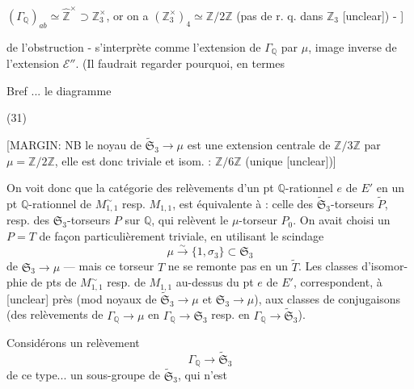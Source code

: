 \begin{enumerate}
[MARGIN: C'est évident - [unclear: il n'y a qu'à voir] $(\Gamma_{\mathbb{Q}})_{ab} \simeq \hat{\mathbb{Z}}^\times \supset \mathbb{Z}_3^\times$, or on a $(\mathbb{Z}_3^\times)_4 \simeq \mathbb{Z}/2\mathbb{Z}$ (pas de r. q. dans $\mathbb{Z}_3$ [unclear]) - ]

de l'obstruction - s'interprète comme l'extension
de $\Gamma_{\mathbb{Q}}$ par $\mu$, image inverse de l'extension
$\mathcal{E}''$. (Il faudrait regarder pourquoi, en termes

\newpage



\newpage


Bref ... le diagramme

(31)

[MARGIN: NB le noyau de $\tilde{\mathfrak{S}}_3 \to \mu$ est une extension centrale de $\mathbb{Z}/3\mathbb{Z}$ par $\mu = \mathbb{Z}/2\mathbb{Z}$, elle est donc triviale et isom. : $\mathbb{Z}/6\mathbb{Z}$ (unique [unclear])]

On voit donc que la catégorie des relèvements
d'un pt $\mathbb{Q}$-rationnel $e$ de $E'$ en un
pt $\mathbb{Q}$-rationnel de $M_{1,1}^\sim$ resp. $M_{1,1}$, est
équivalente à : celle des $\tilde{\mathfrak{S}}_3$-torseurs $\tilde{P}$, resp.
des $\mathfrak{S}_3$-torseurs $P$ sur $\mathbb{Q}$, qui relèvent le
$\mu$-torseur $P_0$. On avait choisi un
$P=T$ de façon particulièrement triviale,
en utilisant le scindage
$$ \mu \xrightarrow{\sim} \{1, \sigma_3\} \subset \mathfrak{S}_3 $$
de $\mathfrak{S}_3 \to \mu$ — mais ce torseur $T$ ne se
remonte pas en un $\tilde{T}$. Les classes d'isomor-
phie de pts de $M_{1,1}^\sim$ resp. de $M_{1,1}$ au-dessus
du pt $e$ de $E'$, correspondent, à [unclear] près
(mod noyaux de $\tilde{\mathfrak{S}}_3 \to \mu$ et $\mathfrak{S}_3 \to \mu$),
aux classes de conjugaisons (des relèvements de
$\Gamma_{\mathbb{Q}} \to \mu$ en $\Gamma_{\mathbb{Q}} \to \mathfrak{S}_3$ resp. en $\Gamma_{\mathbb{Q}} \to \tilde{\mathfrak{S}}_3$).

Considérons un relèvement
$$ \Gamma_{\mathbb{Q}} \to \tilde{\mathfrak{S}}_3 $$
de ce type... un sous-groupe de $\tilde{\mathfrak{S}}_3$, qui n'est


\end{enumerate}
